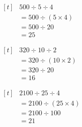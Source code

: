 \documentclass[UTF8]{ctexart}
\newcommand{\cell}[1]{%
  \begin{minipage}[t][49mm][t]{0.315\textwidth}%
    \vspace{0pt}%
    \linespread{1}\zihao{3}%
    #1%
  \end{minipage}%
}
\newcommand{\sheetrow}[3]{%
  \noindent\cell{#1}\hfill\cell{#2}\hfill\cell{#3}\par
  \nointerlineskip
}
\begin{document}
\sheetrow
{\(\begin{aligned}[t]
& 500\div 5\div 4 \\
& = 500\div (5\times 4) \\
& = 500\div 20 \\
& = 25
\end{aligned}\)}
{\(\begin{aligned}[t]
& 320\div 10\div 2 \\
& = 320\div (10\times 2) \\
& = 320\div 20 \\
& = 16
\end{aligned}\)}
{\(\begin{aligned}[t]
& 2100\div 25\div 4 \\
& = 2100\div (25\times 4) \\
& = 2100\div 100 \\
& = 21
\end{aligned}\)}

\newpage
\end{document}
